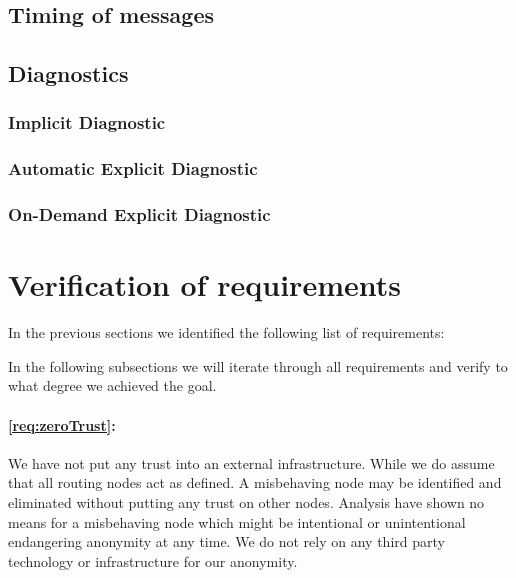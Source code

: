 \subsection{Timing of messages}

\subsection{Diagnostics}



\subsubsection{Implicit Diagnostic}

\subsubsection{Automatic Explicit Diagnostic}

\subsubsection{On-Demand Explicit Diagnostic}

\section{Verification of requirements}
In the previous sections we identified the following list of requirements:

\slistofrequirements

In the following subsections we will iterate through all requirements and verify to what degree we achieved the goal.


\paragraph*{\ref{req:zeroTrust}:} 
We have not put any trust into an external infrastructure. While we do assume that all routing nodes act as defined. A misbehaving node may be identified and eliminated without putting any trust on other nodes. Analysis have shown no means for a misbehaving node which might be intentional or unintentional endangering anonymity at any time. We do not rely on any third party technology or infrastructure for our anonymity. 

